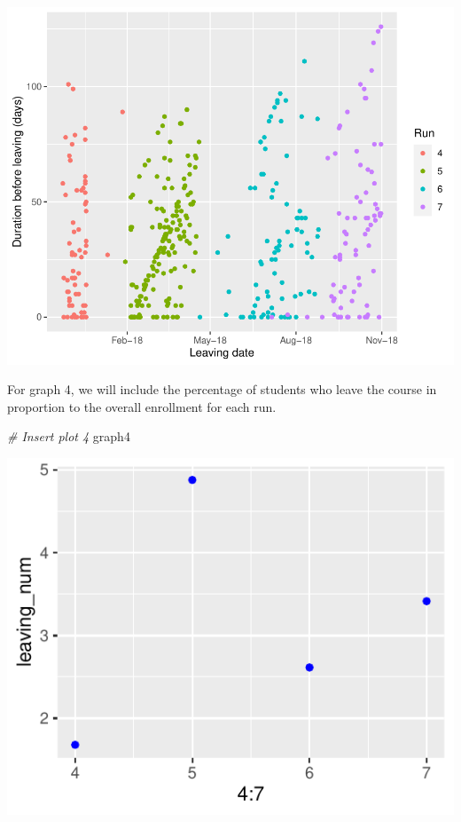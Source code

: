 \documentclass[12pt,]{article}
\newenvironment{Shaded}{\begin{snugshade}}{\end{snugshade}}
\newcommand{\CommentTok}[1]{\textcolor[rgb]{0.56,0.35,0.01}{\textit{#1}}}
\newcommand{\NormalTok}[1]{#1}
\begin{document}
\begin{center}\includegraphics{report_files/figure-latex/unnamed-chunk-5-1} \end{center}

For graph 4, we will include the percentage of students who leave the
course in proportion to the overall enrollment for each run.

\begin{Shaded}
\begin{Highlighting}[]
\CommentTok{\# Insert plot 4}
\NormalTok{graph4}
\end{Highlighting}
\end{Shaded}

\begin{center}\includegraphics{report_files/figure-latex/unnamed-chunk-6-1} \end{center}
\end{document}
